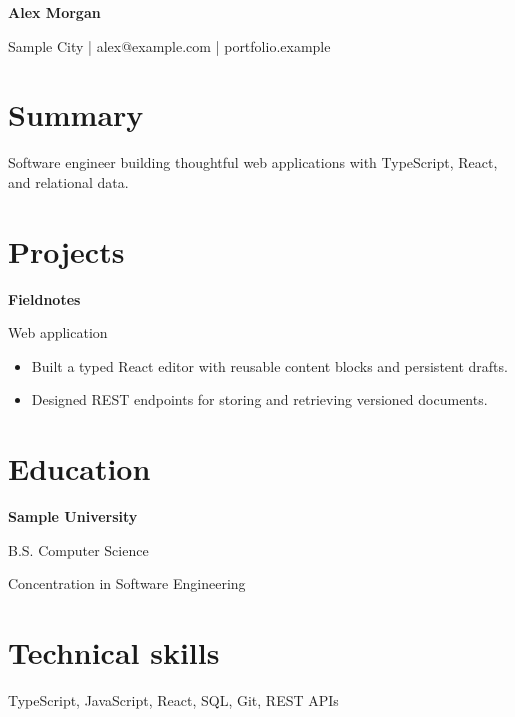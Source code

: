 \documentclass[10pt,letterpaper]{article}
\begin{document}
{\LARGE\bfseries Alex Morgan }\par
Sample City | alex@example.com | portfolio.example\par
\section*{ Summary }
\textbf{  }\par
\par
Software engineer building thoughtful web applications with TypeScript, React, and relational data.\par

\section*{ Projects }
\textbf{ Fieldnotes }\par
Web application\par

\begin{itemize}
\item Built a typed React editor with reusable content blocks and persistent drafts.
\item Designed REST endpoints for storing and retrieving versioned documents.
\end{itemize}
\section*{ Education }
\textbf{ Sample University }\par
B.S. Computer Science\par
Concentration in Software Engineering\par

\section*{ Technical skills }
\textbf{  }\par
\par
TypeScript, JavaScript, React, SQL, Git, REST APIs\par
\end{document}
